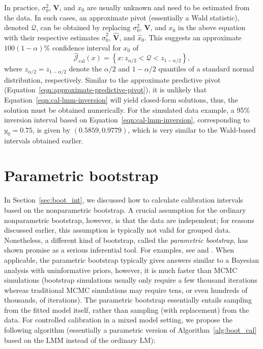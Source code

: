 \documentclass[cmfont,usenames,dvipsnames,leqno]{afit-etd}\usepackage[]{graphicx}\usepackage[]{color}
\newcommand{\mc}[1]{\ensuremath{\mathcal{#1}}}
\newcommand{\wh}[1]{\ensuremath{\widehat{#1}}}
\begin{document}
In practice, $\sigma_0^2$, $\bm{V}$, and $x_0$ are usually unknown and need to be estimated from the data. In such cases, an approximate pivot (essentially a Wald statistic), denoted $\mc{Q}$, can be obtained by replacing $\sigma_0^2$, $\bm{V}$, and $x_0$ in the above equation with their respective estimates $\wh{\sigma}_0^2$, $\wh{\bm{V}}$, and $\wh{x}_0$. This suggests an approximate $100(1-\alpha)\%$ confidence interval for $x_0$ of
\begin{equation}
\label{eqn:cal-lmm-inversion}
  \wh{\mc{J}}_\mathrm{cal}(x) = \left\{ x: z_{\alpha/2} < \mc{Q} < z_{1-\alpha/2} \right\},
\end{equation}
where $z_{\alpha/2} = z_{1-\alpha/2}$ denote the $\alpha/2$ and $1 - \alpha/2$ quantiles of a standard normal distribution, respectively. Similar to the approximate predictive pivot (Equation~\eqref{eqn:approximate-predictive-pivot}), it is unlikely that Equation~\eqref{eqn:cal-lmm-inversion} will yield closed-form solutions, thus, the solution must be obtained numerically. For the simulated data example, a 95\% inversion interval based on Equation~\eqref{eqn:cal-lmm-inversion}, corresponding to $y_0 = 0.75$, is given by $(0.5859, 0.9779)$, which is very similar to the Wald-based intervals obtained earlier.

\section{Parametric bootstrap}
\label{sec:calibration-lmm-parboot}
In Section~\ref{sec:boot_int}, we discussed how to calculate calibration intervals based on the nonparametric bootstrap. A crucial assumption for the ordinary nonparametric bootstrap, however, is that the data are independent; for reasons discussed earlier, this assumption is typically not valid for grouped data. Nonetheless, a different kind of bootstrap, called the \textit{parametric bootstrap}, has shown promise as a serious inferential tool. For examples, see \citet[pg. 342]{mcculloch_generalized_2008} and \citet{efron_bootstrap_2011}. When applicable, the parametric bootstrap typically gives answers similar to a Bayesian analysis with uninformative priors, however, it is much faster than MCMC simulations (bootstrap simulations usually only require a few thousand iterations whereas traditional MCMC simulations may require tens, or even hundreds of thousands, of iterations). The parametric bootstrap essentially entails sampling from the fitted model itself, rather than sampling (with replacement) from the data. For controlled calibration in a mixed model setting, we propose the following algorithm (essentially a parametric version of Algorithm~\ref{alg:boot_cal} based on the \ac{LMM} instead of the ordinary LM):
\end{document}
